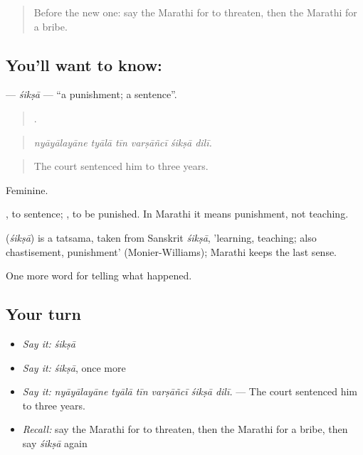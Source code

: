\label{lesson:MR-C300-siksa}



\begin{quote}
Before the new one: say the Marathi for to threaten, then the Marathi for a bribe.
\end{quote}

\subsection*{You'll want to know: }
\textbf{} — \emph{śikṣā} — \textquotedblleft{}a punishment; a sentence\textquotedblright{}.

\begin{quote}
     .
\end{quote}

\begin{quote}
\emph{nyāyālayāne tyālā tīn varṣāñcī śikṣā dilī.}
\end{quote}

\begin{quote}
The court sentenced him to three years.
\end{quote}

Feminine.

 , to sentence;  , to be punished. In Marathi it means punishment, not teaching.

\begin{cousinweb}
\textbf{} (\emph{śikṣā}) is a tatsama, taken from Sanskrit \emph{śikṣā}, 'learning, teaching; also chastisement, punishment' (Monier-Williams); Marathi keeps the last sense.
\end{cousinweb}

\begin{grammarlens}[title={What you've built}]
One more word for telling what happened.
\end{grammarlens}

\subsection*{Your turn}
\begin{itemize}
\raggedright
  \item \emph{Say it:} \emph{śikṣā}
  \item \emph{Say it:} \emph{śikṣā}, once more
  \item \emph{Say it:} \emph{nyāyālayāne tyālā tīn varṣāñcī śikṣā dilī.} — The court sentenced him to three years.
  \item \emph{Recall:} say the Marathi for to threaten, then the Marathi for a bribe, then say \emph{śikṣā} again
\end{itemize}

